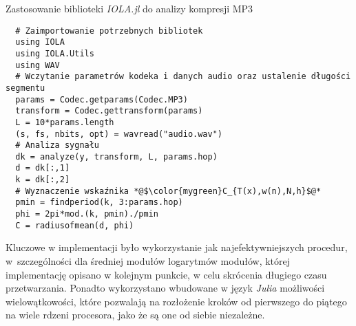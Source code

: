 \documentclass[pl,12pt]{aghdpl}
\begin{document}
\begin{program}
  \caption{Zastosowanie biblioteki \textit{IOLA.jl} do analizy kompresji MP3}
  \label{lst:IOLA_example}
  \begin{lstlisting}
  # Zaimportowanie potrzebnych bibliotek
  using IOLA
  using IOLA.Utils
  using WAV
  # Wczytanie parametrów kodeka i danych audio oraz ustalenie długości segmentu
  params = Codec.getparams(Codec.MP3)
  transform = Codec.gettransform(params)
  L = 10*params.length
  (s, fs, nbits, opt) = wavread("audio.wav")
  # Analiza sygnału
  dk = analyze(y, transform, L, params.hop)
  d = dk[:,1]
  k = dk[:,2]
  # Wyznaczenie wskaźnika *@$\color{mygreen}C_{T(x),w(n),N,h}$@*
  pmin = findperiod(k, 3:params.hop)
  phi = 2pi*mod.(k, pmin)./pmin
  C = radiusofmean(d, phi)
  \end{lstlisting}
\end{program}

Kluczowe w implementacji było wykorzystanie jak najefektywniejszych procedur,
w~szczególności dla średniej modułów logarytmów modułów, której implementację
opisano w kolejnym punkcie, w celu skrócenia długiego czasu przetwarzania.
Ponadto wykorzystano wbudowane w język \textit{Julia} możliwości
wielowątkowości, które pozwalają na rozłożenie kroków od pierwszego do piątego
na wiele rdzeni procesora, jako że są one od siebie niezależne.
\end{document}
